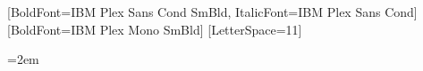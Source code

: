 
\usepackage[a4paper,top=10mm,bottom=7mm,left=12mm,right=12mm]{geometry}
\usepackage{fontspec}
\usepackage{xcolor}
\usepackage{graphicx}
\usepackage{tikz}
\usepackage{enumitem}
\usepackage{tabularx}
\usepackage{array}
\usepackage[hidelinks,unicode]{hyperref}


\setmainfont{IBM Plex Sans Cond}[BoldFont={IBM Plex Sans Cond SmBld}, ItalicFont={IBM Plex Sans Cond}]
\newfontfamily{}[BoldFont={IBM Plex Mono SmBld}]
\newfontfamily{}[LetterSpace=11]

\color{ink}
\pagestyle{empty}
\setlength{\parindent}{0pt}
\setlength{\parskip}{0pt}
\setlength{\tabcolsep}{0pt}
\emergencystretch=2em
\raggedright


\newlength{\labw}\setlength{\labw}{25mm}
\newlength{\bodyw}\setlength{\bodyw}{\dimexpr\textwidth-\labw\relax}

\newcommand{\lab}[1]{{\labelfont\fontsize{6.6}{9}\selectfont\color{ink2}\MakeUppercase{#1}}}
\newcommand{\mono}[1]{{\monofont\fontsize{7.4}{10}\selectfont\color{ink2}#1}}
\newcommand{\addr}[2]{\href{#1}{\mono{#2}}}

\newcommand{\cvsection}[1]{%
  \par\vspace{3pt}%
  {\color{ink}\rule{\textwidth}{1.4pt}}\par
  \vspace{2.5pt}\lab{#1}\par\vspace{3pt}%
}

